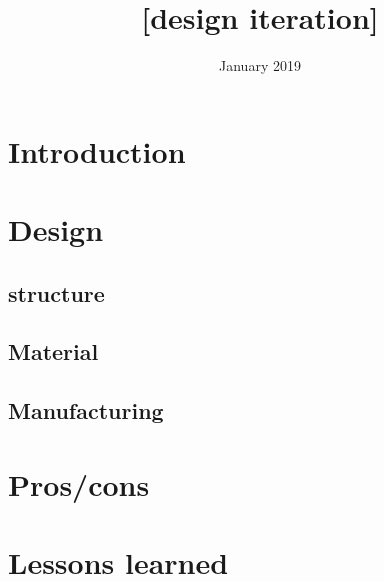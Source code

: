 \documentclass{report}
\title{[design iteration]}
\author{ }
\date{January 2019}
\begin{document}
\maketitle
\tableofcontents

\chapter{Introduction}

\chapter{Design}

\section{structure}

\section{Material}

\section{Manufacturing}

\chapter{Pros/cons}

\chapter{Lessons learned}
\end{document}
